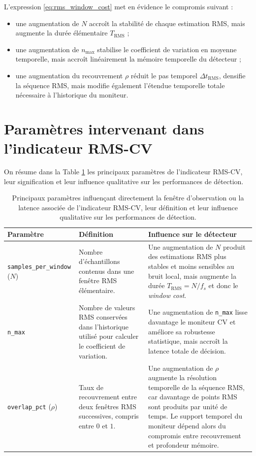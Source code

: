 \documentclass[12pt,a4paper, openany]{book}
\begin{document}
L'expression \eqref{eq:rms_window_cost} met en évidence le compromis suivant :
\begin{itemize}
    \item une augmentation de $N$ accroît la stabilité de chaque estimation RMS, mais augmente la durée élémentaire $T_{\mathrm{RMS}}$ ;
    \item une augmentation de $n_{\max}$ stabilise le coefficient de variation en moyenne temporelle, mais accroît linéairement la mémoire temporelle du détecteur ;
    \item une augmentation du recouvrement $\rho$ réduit le pas temporel $\Delta t_{\mathrm{RMS}}$, densifie la séquence RMS, mais modifie également l'étendue temporelle totale nécessaire à l'historique du moniteur.
\end{itemize}

\section{Paramètres intervenant dans l'indicateur RMS-CV}

On résume dans la Table \ref{tab:rms_cv_parameters_2} les principaux paramètres de l'indicateur RMS-CV, leur signification et leur influence qualitative sur les performances de détection.

\begin{table}[h]
\centering
\caption{Principaux paramètres influençant directement la fenêtre d'observation ou la latence associée de l'indicateur RMS-CV, leur définition et leur influence qualitative sur les performances de détection.}
\label{tab:rms_cv_parameters_2}
\begin{tabularx}{\textwidth}{|l|>{\raggedright\arraybackslash}X|>{\raggedright\arraybackslash}X|}
\hline
\textbf{Paramètre} & \textbf{Définition} & \textbf{Influence sur le détecteur} \\
\hline
\texttt{samples\_per\_window} ($N$) & Nombre d'échantillons contenus dans une fenêtre RMS élémentaire. & Une augmentation de $N$ produit des estimations RMS plus stables et moins sensibles au bruit local, mais augmente la durée $T_{\mathrm{RMS}} = N/f_s$ et donc le \textit{window cost}. \\
\hline
\texttt{n\_max} & Nombre de valeurs RMS conservées dans l'historique utilisé pour calculer le coefficient de variation. & Une augmentation de \texttt{n\_max} lisse davantage le moniteur CV et améliore sa robustesse statistique, mais accroît la latence totale de décision. \\
\hline
\texttt{overlap\_pct} ($\rho$) & Taux de recouvrement entre deux fenêtres RMS successives, compris entre $0$ et $1$. & Une augmentation de $\rho$ augmente la résolution temporelle de la séquence RMS, car davantage de points RMS sont produits par unité de temps. Le support temporel du moniteur dépend alors du compromis entre recouvrement et profondeur mémoire. \\
\hline
\end{tabularx}
\end{table}
\end{document}
